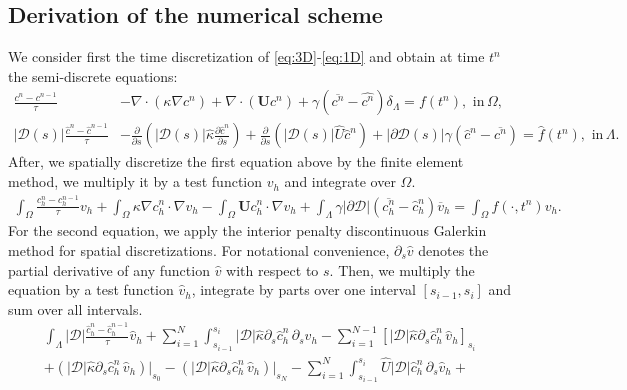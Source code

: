 \documentclass[pdflatex,sn-mathphys-num]{sn-jnl}%
\newcommand{\bfU}{{\boldsymbol U}}
\theoremstyle{thmstyleone}%
\theoremstyle{thmstyletwo}%
\theoremstyle{thmstylethree}%
\begin{document}
\begin{appendices}
%
\section{Derivation of the numerical scheme}
\label{sec:appb}
We consider first the time discretization of \eqref{eq:3D}-\eqref{eq:1D} and obtain at time $t^n$ the semi-discrete equations:
\begin{align*}
\frac{c^n-c^{n-1}}{\tau} & - \nabla \cdot (\kappa \nabla c^n) +\nabla \cdot (\bfU c^n) 
+ \gamma (\overline{c^n} - \hat{c^n}) \delta_\Lambda = f(t^n), \,\, \mbox{in}\,\Omega,\\
|\mathcal{D}(s)|\frac{\hat c^n - \hat c^{n-1}}{\tau} & - \frac{\partial}{\partial s}\left(|\mathcal{D}(s)|\hat \kappa \frac{\partial\hat c^n}{\partial s}\right) +\frac{\partial}{\partial s}\left(|\mathcal{D}(s)| \hat U \hat c^n\right) + |\partial\mathcal{D}(s)|\gamma (\hat c^n-\overline{c^n}) 
= \hat f(t^n), \,\,\mbox{in}\,\Lambda.
\end{align*}
After, we spatially discretize the first equation above by the finite element method, we multiply it by a test function $v_h$ and integrate over $\Omega$.
\begin{align*}
\int_\Omega \frac{c_h^n-c_h^{n-1}}{\tau} v_h
+  \int_\Omega  \kappa \nabla c_h^n \cdot \nabla v_h
- \int_\Omega \bfU c_h^n \cdot \nabla v_h
+\int_\Lambda\gamma \vert \partial\mathcal{D}\vert \left(\overline{c_h^n}-\hat{c}_h^n\right)\overline{v}_h
= \int_\Omega f(\cdot,t^n) v_h.
\end{align*}
For the second equation, we apply the interior penalty discontinuous Galerkin method for spatial discretizations. For notational convenience, $\partial_s \hat v$ denotes the partial derivative of any function $\hat v$ with respect to $s$. Then, we multiply the equation by a test function $\hat v_h$, integrate by parts over one interval $[s_{i-1},s_i]$ and sum over all intervals. 
\begin{align*}
\int_\Lambda |\mathcal{D}|\frac{\hat c_h^n-\hat c_h^{n-1}}{\tau}\hat{v}_h
+\sum_{i=1}^{N} \int_{s_{i-1}}^{s_i} 
|\mathcal{D}|\hat \kappa \partial_s \hat c_h^n\, \partial_s \hat v_h
-  \sum_{i=1}^{N-1} [|\mathcal{D}| \hat \kappa \partial_s \hat c_h^n \, \hat v_h]_{s_i} \\
+ (|\mathcal{D}| \hat \kappa \partial_s \hat c_h^n\, \hat v_h)\Big|_{s_0} - (|\mathcal{D}| \hat \kappa \partial_s \hat c_h^n \, \hat v_h)\Big|_{s_N}
-\sum_{i=1}^{N}\int_{s_{i-1}}^{s_i} \hat{U} |\mathcal{D}| \hat{c}_h^n \, \partial_s \hat v_h +

\end{align*}
\end{appendices}
\end{document}
